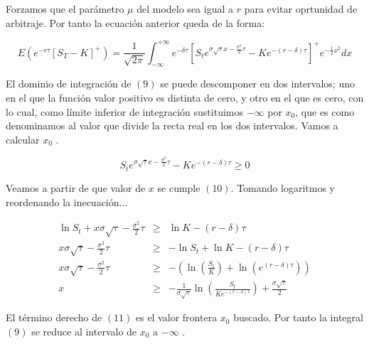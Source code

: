 \documentclass[12pt]{article}
\begin{document}
Forzamos que el par\'{a}metro $\mu$ del modelo sea igual a $r$ para evitar oprtunidad de arbitraje. Por tanto la ecuaci\'{o}n anterior queda
de la forma:
\newline

\begin{equation}
	E\left( e^{-r\tau} \left[ S_{T} - K \right] ^{+} \right) = \frac{1}{\sqrt{2\pi}}\int_{-\infty}^{+\infty}e^{-\delta\tau}
	\left[S_{t}e^{\sigma\sqrt{\tau}x-\frac{\sigma^{2}}{2}\tau}-Ke^{-(r-\delta)\tau}\right]^{+}e^{-
	\frac{1}{2}x^{2}}dx
\end{equation}
\newline

El dominio de integraci\'{o}n de $(9)$ se puede descomponer en dos intervalos; uno en el que la funci\'{o}n valor positivo es distinta de
cero, y otro en el que es cero, con lo cual, como l\'{i}mite inferior de integraci\'{o}n sustituimos $-\infty$ por $x_{0}$, 
que es como denominamos al valor que divide la recta real en los dos intervalos. Vamos a calcular $x_{0}$ .
\newline

\begin{equation}
	S_{t}e^{\sigma\sqrt{\tau}x-\frac{\sigma^{2}}{2}\tau}-Ke^{-\left(r-\delta\right)\tau} \geq 0
\end{equation}
\newline

Veamos a partir de que valor de $x$ se cumple $(10)$. Tomando logaritmos y reordenando la inecuaci\'{o}n...
\newline

\begin{eqnarray}
	\ln S_{t} +x\sigma\sqrt{\tau} - \frac{\sigma^{2}}{2}\tau & \geq & \ln K - \left(r - \delta \right) \tau \nonumber \\
	x\sigma\sqrt{\tau} - \frac{\sigma^{2}}{2}\tau & \geq & -\ln S_{t} + \ln K - \left( r - \delta \right) \tau \nonumber \\
	x\sigma\sqrt{\tau} - \frac{\sigma^{2}}{2}\tau & \geq & -\left(\ln\left(\frac{S_{t}}{K}\right) + \ln\left(e^{\left(r-
	\delta\right)\tau}\right)\right) \nonumber \\
	x & \geq & - \frac{1}{\sigma\sqrt{\tau}} \ln\left(\frac{S_{t}}{Ke^{-\left(r-\delta\right)\tau}}\right) + 
	\frac{\sigma\sqrt{\tau}}{2}
\end{eqnarray}
\newline

El t\'{e}rmino derecho de $(11)$ es el valor frontera $x_{0}$ buscado. Por tanto la integral $(9)$ se reduce al intervalo de $x_{0}$ a
$-\infty$ .
\newline
\end{document}
